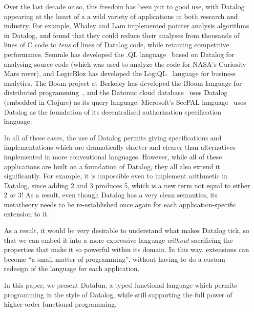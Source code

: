 Over the last decade or so, this freedom has been put to good use, with Datalog
appearing at the heart of a a wild variety of applications in both research and
industry. For example, Whaley and Lam \cite{whaley-lam,whaley-phd} implemented
pointer analysis algorithms in Datalog, and found that they could reduce their
analyses from thousands of lines of C code to \emph{tens} of lines of Datalog
code, while retaining competitive performance. Semmle has developed the .QL
language~\cite{semmlecode,ql-inference} based on Datalog for analysing source
code (which was used to analyze the code for NASA's Curiosity Mars rover), and
LogicBlox has developed the LogiQL~\cite{logicblox} language for business
analytics. The Boom project at Berkeley has developed the Bloom language for
distributed programming~\cite{bloom}, and the Datomic cloud
database~\cite{datomic} uses Datalog (embedded in Clojure) as its query
language. Microsoft's SecPAL language~\cite{secpal} uses Datalog as the
foundation of its decentralised authorization specification language.

In all of these cases, the use of Datalog permits giving specifications and
implementations which are dramatically shorter and clearer than alternatives
implemented in more conventional languages. However, while all of these
applications are built on a foundation of Datalog, they all also extend it
significantly. For example, it is impossible even to implement arithmetic in
Datalog, since adding 2 and 3 produces 5, which is a new term not equal to
either 2 or 3! As a result, even though Datalog has a very clean semantics, its
metatheory needs to be re-established once again for each application-specific
extension to it.

As a result, it would be very desirable to understand what makes Datalog tick,
so that we can embed it into a more expressive language \emph{without}
sacrificing the properties that make it so powerful within its domain. In this
way, extensions can become ``a small matter of programming'', without having to
do a custom redesign of the language for each application.


In this paper, we present Datafun, a typed functional language which permits
programming in the style of Datalog, while still supporting the full power of
higher-order functional programming.

